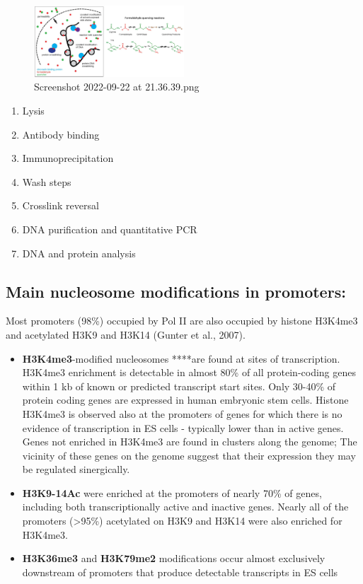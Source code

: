 \begin{figure}
\centering
\includegraphics[width=0.5\textwidth]{../_resources/Screenshot_2022-09-22_at_21-36-39.png}
\caption{Screenshot 2022-09-22 at 21.36.39.png}
\end{figure}

\begin{enumerate}
\def\labelenumi{\arabic{enumi}.}
\tightlist
\item
  Lysis
\item
  Antibody binding
\item
  Immunoprecipitation
\item
  Wash steps
\item
  Crosslink reversal
\item
  DNA purification and quantitative PCR
\item
  DNA and protein analysis
\end{enumerate}

\hypertarget{main-nucleosome-modifications-in-promoters}{%
\subsection{Main nucleosome modifications in promoters:}\label{main-nucleosome-modifications-in-promoters}}

Most promoters (98\%) occupied by Pol II are also occupied by histone H3K4me3 and acetylated H3K9 and H3K14 (Gunter et al., 2007).

\begin{itemize}
\tightlist
\item
  \textbf{H3K4me3}-modified nucleosomes ****are found at sites of transcription. H3K4me3 enrichment is detectable in almost 80\% of all protein-coding genes within 1 kb of known or predicted transcript start sites. Only 30-40\% of protein coding genes are expressed in human embryonic stem cells. Histone H3K4me3 is observed also at the promoters of genes for which there is no evidence of transcription in ES cells - typically lower than in active genes. Genes not enriched in H3K4me3 are found in clusters along the genome; The vicinity of these genes on the genome suggest that their expression they may be regulated sinergically.
\item
  \textbf{H3K9-14Ac} were enriched at the promoters of nearly 70\% of genes, including both transcriptionally active and inactive genes. Nearly all of the promoters (\textgreater95\%) acetylated on H3K9 and H3K14 were also enriched for H3K4me3.
\item
  \textbf{H3K36me3} and \textbf{H3K79me2} modifications occur almost exclusively downstream of promoters that produce detectable transcripts in ES cells
\end{itemize}

